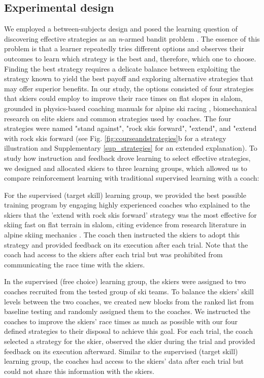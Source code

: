 \documentclass[pdflatex,sn-nature]{sn-jnl}%
\theoremstyle{thmstyleone}%
\theoremstyle{thmstyletwo}%
\theoremstyle{thmstylethree}%
\begin{document}
\subsection{Experimental design}
We employed a between-subjects design and posed the learning question of discovering effective strategies as an \textit{n}-armed bandit problem \cite{sutton_reinforcement_2018}. The essence of this problem is that a learner repeatedly tries different options and observes their outcomes to learn which strategy is the best and, therefore, which one to choose. Finding the best strategy requires a delicate balance between exploiting the strategy known to yield the best payoff and exploring alternative strategies that may offer superior benefits. In our study, the options consisted of four strategies that skiers could employ to improve their race times on flat slopes in slalom, grounded in physics-based coaching manuals for alpine ski racing \cite{lemaster_skiers_1999, lemaster_ultimate_2010, lind_physics_2013, mote_accelerations_1983}, biomechanical research on elite skiers \cite{reid_kinematic_2010, reid_alpine_2020, magelssen_is_2022}  and common strategies used by coaches.  The four strategies were named "stand against", "rock skis forward", "extend", and "extend with rock skis forward (see Fig. \ref{fig:courseandstrategies}b for a strategy illustration and Supplementary \ref{sup_strategies} for an extended explanation). To study how instruction and feedback drove learning to select effective strategies, we designed and allocated skiers to three learning groups, which allowed us to compare reinforcement learning with traditional supervised learning with a coach: 

For the supervised (target skill) learning group, we provided the best possible training program by engaging highly experienced coaches who explained to the skiers that the 'extend with rock skis forward' strategy was the most effective for skiing fast on flat terrain in slalom, citing evidence from research literature in alpine skiing mechanics \cite{reid_kinematic_2010, mote_accelerations_1983, lind_physics_2013}. The coach then instructed the skiers to adopt this strategy and provided feedback on its execution after each trial. Note that the coach had access to the skiers after each trial but was prohibited from communicating the race time with the skiers.

In the supervised (free choice) learning group, the skiers were assigned to two coaches recruited from the tested group of ski teams. To balance the skiers' skill levels between the two coaches, we created new blocks from the ranked list from baseline testing and randomly assigned them to the coaches. We instructed the coaches to improve the skiers' race times as much as possible with our four defined strategies to their disposal to achieve this goal. For each trial, the coach selected a strategy for the skier, observed the skier during the trial and provided feedback on its execution afterward. Similar to the supervised (target skill) learning group, the coaches had access to the skiers' data after each trial but could not share this information with the skiers.
\end{document}
